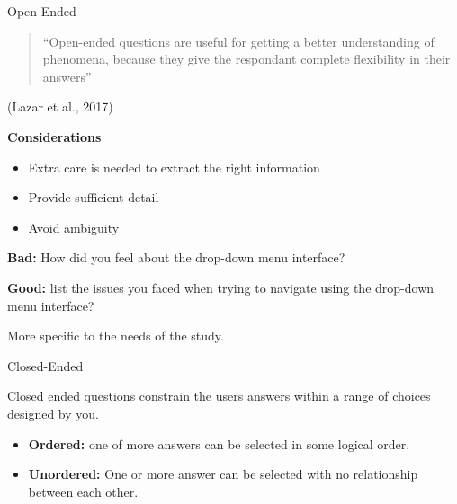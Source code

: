 \begin{frame}{Open-Ended}

\begin{quote}
``Open-ended questions are useful for getting a better understanding of
phenomena, because they give the respondant complete flexibility in
their answers''
\end{quote}

(Lazar et al., 2017)

\textbf{Considerations}

\begin{itemize}
\tightlist
\item
  Extra care is needed to extract the right information
\item
  Provide sufficient detail
\item
  Avoid ambiguity
\end{itemize}

\end{frame}

\begin{frame}

\textbf{Bad:} How did you feel about the drop-down menu interface?

\textbf{Good:} list the issues you faced when trying to navigate using
the drop-down menu interface?

More specific to the needs of the study.

\end{frame}

\begin{frame}{Closed-Ended}

Closed ended questions constrain the users answers within a range of
choices designed by you.

\begin{itemize}
\tightlist
\item
  \textbf{Ordered:} one of more answers can be selected in some logical
  order.
\item
  \textbf{Unordered:} One or more answer can be selected with no
  relationship between each other.
\end{itemize}

\end{frame}


